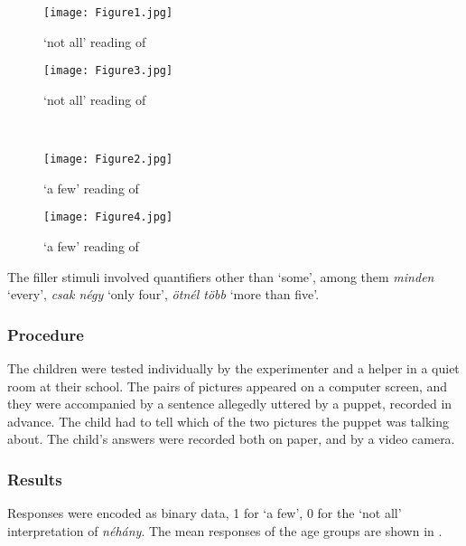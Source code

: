 \documentclass[output=paper]{langscibook}
\begin{document}
\begin{figure}[h]
\RawFloats
\centering
\begin{minipage}[b]{0.5\textwidth}
    \centering
    \texttt{[image: Figure1.jpg]}
    \caption{`not all' reading of }
    \label{kis-zet:cow not all}
\end{minipage}\begin{minipage}[b]{0.5\textwidth}
    \centering
    \texttt{[image: Figure3.jpg]}
    \caption{`not all' reading of }
    \label{kis-zet:bicycle not all}
\end{minipage}\\
\begin{minipage}[b]{0.5\textwidth}
    \centering
    \texttt{[image: Figure2.jpg]}
    \caption{`a few' reading of }
    \label{kis-zet:com few}
\end{minipage}\begin{minipage}[b]{0.5\textwidth}
    \centering
    \texttt{[image: Figure4.jpg]}
    \caption{`a few' reading of }
    \label{kis-zet:bicycle few}
\end{minipage}
\end{figure}

The filler stimuli involved quantifiers other than `some', among them \textit{minden} `every', \textit{csak négy} `only four', \textit{ötnél több} `more than five'.

\subsubsection{Procedure}

The children were tested individually by the experimenter and a helper in a quiet room at their school. The pairs of pictures appeared on a computer screen, and they were accompanied by a sentence allegedly uttered by a puppet, recorded in advance. The child had to tell which of the two pictures the puppet was talking about. The child’s answers were recorded both on paper, and by a video camera.

\subsubsection{Results} 

Responses were encoded as binary data, 1 for `a few', 0 for the `not all' interpretation of \textit{néhány}. The mean responses of the age groups are shown in . 
\end{document}
